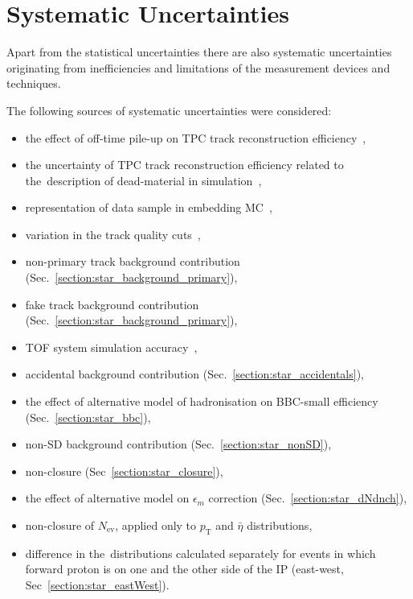 \chapter{Systematic Uncertainties}\label{section:star_systematics}
Apart from the statistical uncertainties there are also systematic uncertainties originating from inefficiencies and limitations of the measurement devices and techniques. 


The following sources of systematic uncertainties were considered:
\begin{itemize}
	\item the effect of off-time pile-up on TPC track reconstruction efficiency~\cite{supplementaryNote},
	\item the uncertainty of TPC track reconstruction efficiency related to the~description of dead-material in simulation~\cite{supplementaryNote},
	\item representation of data sample in embedding MC~\cite{supplementaryNote},
	\item variation in the track quality cuts~\cite{supplementaryNote},
	\item non-primary track background contribution (Sec.~\ref{section:star_background_primary}),
	\item fake track background contribution (Sec.~\ref{section:star_background_primary}),
	\item TOF system simulation accuracy~\cite{supplementaryNote},
	\item accidental background contribution (Sec.~\ref{section:star_accidentals}),
	\item the effect of alternative model of hadronisation on BBC-small efficiency (Sec.~\ref{section:star_bbc}),
	\item non-SD background contribution (Sec.~\ref{section:star_nonSD}),
	\item non-closure (Sec~\ref{section:star_closure}),%
	\item the effect of alternative model  on $\epsilon_{ m}$ correction (Sec.~\ref{section:star_dNdnch}),
	\item non-closure of $N_\textrm{ev}$, applied only to $p_\textrm{T}$ and $\bar{\eta}$ distributions,
	\item difference in the~distributions calculated separately for events in which forward proton is on one and the other side of the IP (east-west, Sec~\ref{section:star_eastWest}).
\end{itemize}

